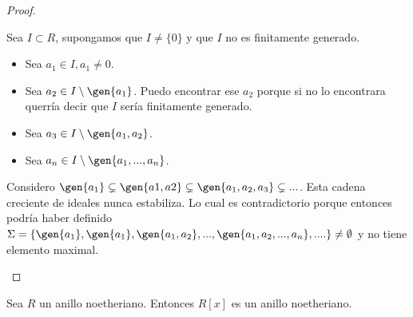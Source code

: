 \begin{proof}
\begin{itemize}
		Sea $I \subset R$, supongamos que $I\neq \{0\}$ y que $I$ no es finitamente generado.
		\begin{itemize}
			\item Sea $a_1 \in I, a_1 \neq 0$.
			\item Sea $a_2 \in I\setminus \gen{a_1}$. Puedo encontrar ese $a_2$ porque si no lo encontrara querría decir que $I$ sería finitamente generado.
			\item Sea $a_3 \in I\setminus \gen{a_1,a_2}$.
			\item Sea $a_n \in I\setminus \gen{a_1,...,a_n}$.
		\end{itemize}
		Considero $\gen{a_1}\subsetneq \gen{a1,a2} \subsetneq \gen{a_1,a_2,a_3} \subsetneq...$. Esta cadena creciente de ideales nunca estabiliza. Lo cual es contradictorio porque entonces podría haber definido $\Sigma=\{ \gen{a_1}, \gen{a_1},\gen{a_1,a_2},...,\gen{a_1,a_2,...,a_n},.... \} \neq \emptyset$ y no tiene elemento maximal.
	\end{itemize}
\end{proof}

\begin{theorem}\label{tma:tma_base_hilbert}
	Sea $R$ un anillo noetheriano. Entonces $R[x]$ es un anillo noetheriano.
\end{theorem}

